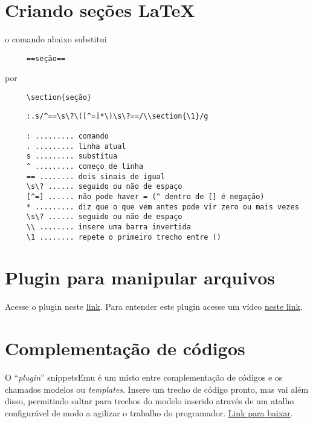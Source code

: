 \section{Criando seções \LaTeX}\label{Criando seções latex}
o comando abaixo substitui

\begin{verbatim}
     ==seção==
\end{verbatim}

   por

\begin{verbatim}
     \section{seção}
\end{verbatim}

\begin{verbatim}
     :.s/^==\s\?\([^=]*\)\s\?==/\\section{\1}/g
     
     : ......... comando
     . ......... linha atual
     s ......... substitua
     ^ ......... começo de linha
     == ........ dois sinais de igual
     \s\? ...... seguido ou não de espaço
     [^=] ...... não pode haver = (^ dentro de [] é negação)
     * ......... diz que o que vem antes pode vir zero ou mais vezes
     \s\? ...... seguido ou não de espaço
     \\ ........ insere uma barra invertida
     \1 ........ repete o primeiro trecho entre ()
\end{verbatim}

\section{Plugin para manipular arquivos}
Acesse o plugin neste
\href{http://www.vim.org/scripts/script.php?script\_id=2337#0.1.9}{link}.
Para entender este plugin acesse um vídeo
 \href{http://www.screencast.com/t/P6nJkJ0DE}{neste link}.


\section{Complementação de códigos}
\label{Complementação de códigos}

O ``{\em plugin}'' snippetsEmu é um misto entre complementação de códigos e
os chamados modelos ou {\em templates}. Insere um trecho de código pronto,
mas vai além disso, permitindo saltar para trechos do modelo inserido
através de um atalho configurável de modo a agilizar o trabalho do
programador. \href{http://www.vim.org/scripts/script.php?script\_id=1318}{Link para baixar}.

